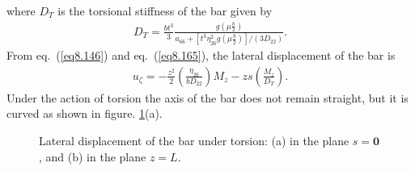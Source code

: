 \documentclass{AeroStructure-ERJohnson}
\begin{document}
where $D_{T}$ is the torsional stiffness of the bar given\vspace*{-2pt} by
\begin{align}\label{eq8.194}
D_{T}=\frac{b t^{3}}{3} \frac{g\left(\mu
\frac{b}{2}\right)}{a_{66}+\left[t^{3} \eta_{26}^{2} g\left(\mu
\frac{b}{2}\right)\right]/\left(3 D_{22}\right)}.
\end{align}
From eq.~(\ref{eq8.146}) and eq.~(\ref{eq8.165}), the lateral
displacement of the bar\vspace*{-2pt} is
\begin{align}\label{eq8.195}
u_{\zeta}=-\frac{z^{2}}{2}\left(\frac{\eta_{26}}{b D_{22}}\right)
M_{z}-z s\left(\frac{M_{z}}{D_{T}}\right).
\end{align}
Under the action of torsion the axis of the bar does not remain
straight, but it is curved as shown in figure. \ref{fig8.14}(a).

\begin{figure}[!h]
\caption{Lateral displacement of the bar under torsion: (a) in the plane $s = \textbf{0}$, and (b) in the plane $z = L$.\label{fig8.14}}\vspace*{-10pt}
\end{figure}

\end{document}
